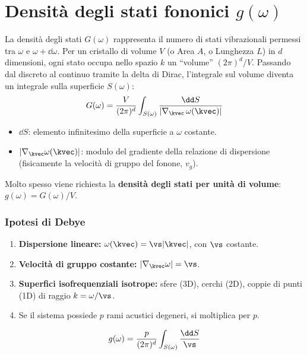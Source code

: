 \newpage


\section{Densità degli stati fononici $g(\omega)$}
\label{sec:dosfononi}
La densità degli stati $G(\omega)$ rappresenta il numero di stati vibrazionali permessi tra $\omega$ e $\omega+\dd\omega$. Per un cristallo di volume $V$ (o Area $A$, o Lunghezza $L$) in $d$ dimensioni, ogni stato occupa nello spazio $k$ un ``volume'' $(2\pi)^d/V$. Passando dal discreto al continuo tramite la delta di Dirac, l'integrale sul volume diventa un integrale sulla superficie $S(\omega)$:
\[ G(\omega) = \frac{V}{(2\pi)^d} \int_{S(\omega)} \frac{\dd S}{|\nabla_{\kvec}\, \omega(\kvec)|} \]
\begin{itemize}
    \item $\dd S$: elemento infinitesimo della superficie a $\omega$ costante.
    \item $|\nabla_{\kvec} \omega(\kvec)|$: modulo del gradiente della relazione di dispersione (fisicamente la velocità di gruppo del fonone, $v_g$).
\end{itemize}
Molto spesso viene richiesta la \textbf{densità degli stati per unità di volume}: $g(\omega)=G(\omega)/V$.

\subsubsection*{Ipotesi di Debye}
\begin{enumerate}
    \item \textbf{Dispersione lineare:} $\omega(\kvec) = \vs|\kvec|$, con $\vs$ costante.
    \item \textbf{Velocità di gruppo costante:} $|\nabla_{\kvec}\omega| = \vs$.
    \item \textbf{Superfici isofrequenziali isotrope:} sfere (3D), cerchi (2D), coppie di punti (1D) di raggio $k=\omega/\vs$.
    \item Se il sistema possiede $p$ rami acustici degeneri, si moltiplica per $p$.
\end{enumerate}

\[g(\omega) = \frac{p}{(2\pi)^d}\int_{S(\omega)}\frac{\dd S}{\vs}\]

\vspace{0.3cm}

